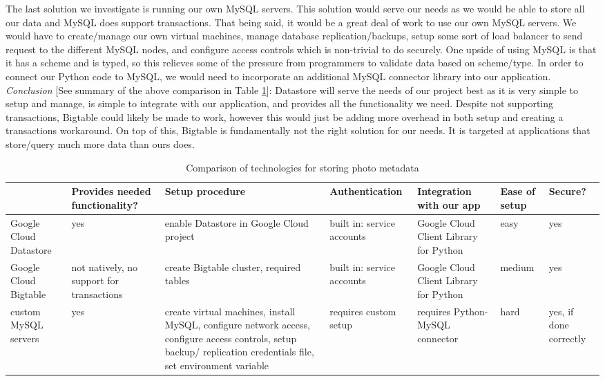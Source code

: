 \documentclass[10pt, onecolumn, draftclsnofoot, letterpaper, compsoc]{IEEEtran}
\begin{document}
The last solution we investigate is running our own MySQL servers. This solution
would serve our needs as we would be able to store all our data and MySQL
does support transactions. That being said, it would be a great deal of work to
use our own MySQL servers. We would have to create/manage our own virtual machines,
manage database replication/backups, setup some sort of load balancer to send
request to the different MySQL nodes, and configure access controls which is
non-trivial to do securely. One upside of using MySQL is that it has a scheme
and is typed, so this relieves some of the pressure from programmers to
validate data based on scheme/type. In order to connect our Python code to MySQL,
we would need to incorporate an additional MySQL connector library into our
application\cite{mysql}. \\

\textit{Conclusion} [See summary of the above comparison in Table \ref{table:bret2}]:
Datastore will serve the needs of our project best as it is
very simple to setup and manage, is simple to integrate with our application,
and provides all the functionality we need. Despite not supporting transactions,
Bigtable could likely be made to work, however this would just be adding more
overhead in both setup and creating a transactions workaround. On top of this,
Bigtable is fundamentally not the right solution for our needs. It is
targeted at applications that store/query much more data than ours does. \\

\begin{table}[h]
\centering
\caption{Comparison of technologies for storing photo metadata}
\begin{tabular}{|p{1.8cm}|p{1.4cm}|p{3cm}|p{1.8cm}|p{1.8cm}|p{1.8cm}|p{1cm}|}
\cline{4-4}
\hline

 & Provides needed functionality? & Setup procedure & Authentication
 & Integration with our app & Ease of setup & Secure? \\ \hline

Google Cloud Datastore & yes & enable Datastore in Google Cloud project
& built in: service accounts & Google Cloud Client Library for Python
& easy & yes \\ \hline

Google Cloud Bigtable & not natively, no support for transactions &
create Bigtable cluster, required tables & built in: service accounts
& Google Cloud Client Library for Python & medium & yes \\ \hline

custom MySQL servers & yes & create virtual machines, install MySQL,
configure network access, configure access controls, setup backup/
replication credentials file, set environment variable & requires custom setup
& requires Python-MySQL connector & hard & yes, if done correctly \\ \hline

\end{tabular}
\label{table:bret2}
\end{table}
\end{document}
